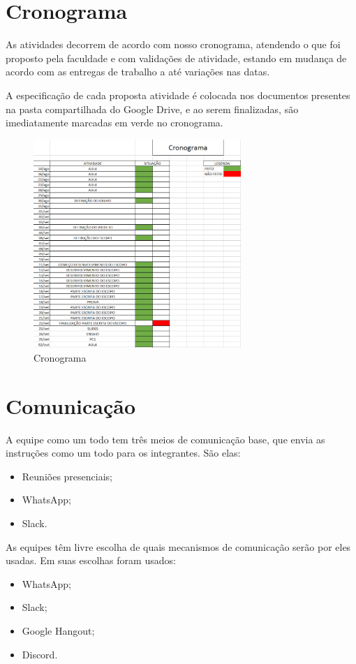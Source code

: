 \section{Cronograma}
\par As atividades decorrem de acordo com nosso cronograma, atendendo o que foi proposto pela faculdade  e com validações de atividade, estando em mudança de acordo com as entregas de trabalho a até variações nas datas.
\par A especificação de cada proposta atividade é colocada nos documentos presentes na pasta compartilhada do Google Drive, e ao serem finalizadas, são imediatamente marcadas em verde no cronograma.

\begin{figure}[ht]
\center
\caption{Cronograma}
\includegraphics[width=0.7\textwidth]{figuras/cronograma}
\end{figure}

\newpage

\section{Comunicação}
\par A equipe como um todo tem três meios de comunicação base, que envia as instruções como um todo para os integrantes. São elas:
\begin{itemize}
    \item Reuniões presenciais;
    \item WhatsApp;
    \item Slack.
\end{itemize}
\par As equipes têm livre escolha de quais mecanismos de comunicação serão por eles usadas. Em suas escolhas foram usados:
\begin{itemize}
    \item WhatsApp;
    \item Slack;
    \item Google Hangout;
    \item Discord.
\end{itemize}

